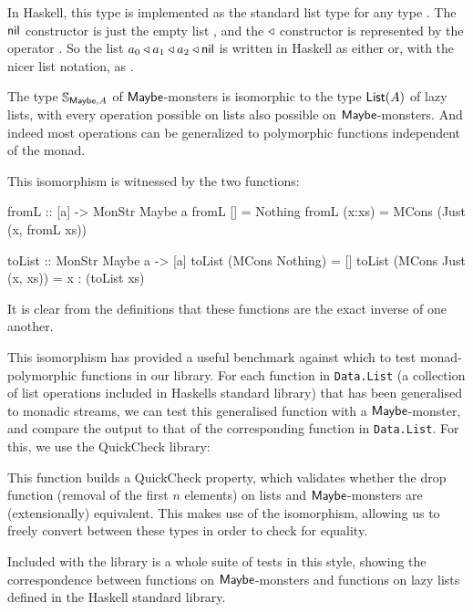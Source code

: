 In Haskell, this type is implemented as the standard list type \hcode{[a]} for any type . The $\mathsf{nil}$ constructor is just the empty list \hcode{[]}, and the $\triangleleft$ constructor is represented by the operator \hcode{(:)}.
So the list $a_0\triangleleft a_1\triangleleft a_2\triangleleft \mathsf{nil}$ is written in Haskell as either  or, with the nicer list notation, as \hcode{[a0,a1,a2]}.

The type $\mathbb{S}_{\mathsf{Maybe},A}$ of $\mathsf{Maybe}$-monsters is isomorphic to the type $\mathsf{List}(A)$ of lazy lists, with every operation possible on lists also possible on $\mathsf{Maybe}$-monsters.
And indeed most operations can be generalized to polymorphic functions independent of the monad.

This isomorphism is witnessed by the two functions:
\begin{haskell}
fromL :: [a] -> MonStr Maybe a
fromL [] = Nothing
fromL (x:xs) = MCons (Just (x, fromL xs))

toList :: MonStr Maybe a -> [a]
toList (MCons Nothing) = []
toList (MCons Just (x, xs)) = x : (toList xs)
\end{haskell} 

It is clear from the definitions that these functions are the exact inverse of one another. 

This isomorphism has provided a useful benchmark  against which to test monad-polymorphic functions in our library. For each function in \verb+Data.List+ (a collection of list operations included in Haskells standard library) that has been generalised to monadic streams, we can test this generalised function with a $\mathsf{Maybe}$-monster, and compare the output to that of the corresponding function in \verb+Data.List+. For this, we use the QuickCheck \cite{quickcheck} library:


This function builds a QuickCheck property, which validates whether the drop function (removal of the first $n$ elements) on lists and $\mathsf{Maybe}$-monsters are (extensionally) equivalent. This makes use of the isomorphism, allowing us to freely convert between these types in order to check for equality.

Included with the library is a whole suite of tests in this style, showing the correspondence between functions on $\mathsf{Maybe}$-monsters and functions on lazy lists defined in the Haskell standard library.

